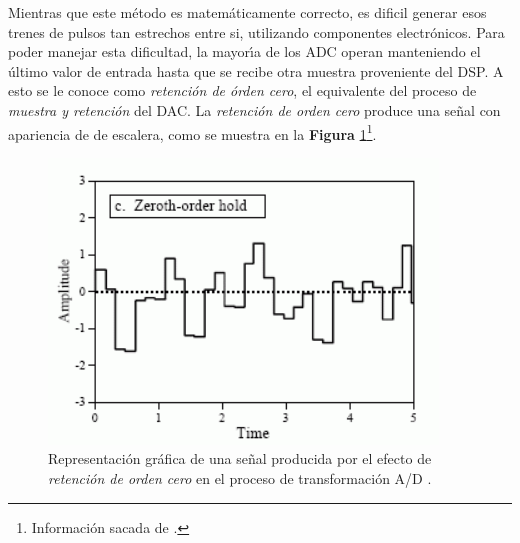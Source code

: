 Mientras que este m\'{e}todo es matem\'{a}ticamente correcto, es dificil
generar esos trenes de pulsos tan estrechos entre si, utilizando componentes
electr\'{o}nicos. Para poder manejar esta dificultad, la mayor\'{\i}a
de los ADC operan manteniendo el \'{u}ltimo valor de entrada hasta
que se recibe otra muestra proveniente del DSP. A esto se le conoce
como \emph{retenci\'{o}n de \'{o}rden cero}, el equivalente del proceso
de \emph{muestra y retenci\'{o}n}\textbf{ }del DAC. La \emph{retenci\'{o}n
de orden cero }produce una se\~{n}al con apariencia de de escalera,
como se muestra en la \textbf{Figura} \ref{fig:Representaci=0000F3n-gr=0000E1fica-de-1}\footnote{Informaci\'{o}n sacada de \cite{chapter_3}.}. 

\begin{figure}[H]
\centering{}\includegraphics[scale=0.6]{img/staircase}\caption{Representaci\'{o}n gr\'{a}fica de una se\~{n}al producida por el efecto
de \emph{retenci\'{o}n de orden cero}\textbf{\emph{ }}en el proceso
de transformaci\'{o}n A/D \cite{chapter_3}\label{fig:Representaci=0000F3n-gr=0000E1fica-de-1}.}
\end{figure}

